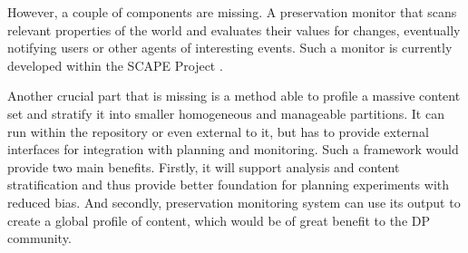 However, a couple of components are missing. A preservation monitor that scans relevant properties of the world and evaluates their values for changes, eventually notifying users or other agents of interesting events. Such a monitor is currently developed within the SCAPE Project \cite{becker-ipres2012}.

Another crucial part that is missing is a method able to profile a massive content set and stratify it into smaller homogeneous and manageable partitions. It can run within the repository or even external to it, but has to provide external interfaces for integration with planning and monitoring. Such a framework would provide two main benefits. Firstly, it will support analysis and content stratification and thus provide better foundation for planning experiments with reduced bias. And secondly, preservation monitoring system can use its output to create a global profile of content, which would be of great benefit to the DP community.